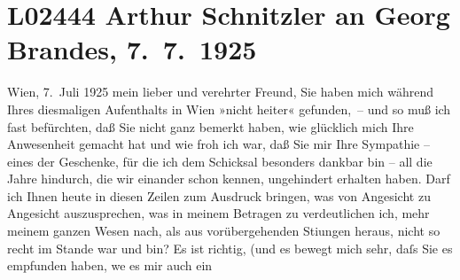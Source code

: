 

\section[Arthur Schnitzler an Georg Brandes, 7. 7. 1925]{L02444 Arthur Schnitzler an Georg Brandes, 7. 7. 1925}
\nopagebreak{}
\rehead{ }\normalsize\beginnumbering{}
\toendnotes[C]{\smallbreak\pagebreak[2]}
\toendnotes[C]{\smallbreak}
\pstart
           \raggedleft{}{\pb}Wien, 7. Juli 1925\pend
           \vspace{0.5em}
\pstart
           mein lieber und verehrter Freund, Sie haben mich während Ihres
               diesmaligen Aufenthalts in Wien »nicht heiter«
               gefunden, – und so muß ich fast befürchten, daß Sie nicht ganz bemerkt haben, wie
               glücklich mich Ihre Anwesenheit gemacht hat und wie froh ich war, daß Sie mir Ihre
               Sympathie – eines der Geschenke, für die ich dem Schicksal besonders dankbar bin –
               all die Jahre hindurch, die wir einander schon kennen, ungehindert erhalten haben.
               Darf ich Ihnen heute in diesen Zeilen zum Ausdruck bringen, was von Angesicht zu
               Angesicht auszusprechen, was in meinem Betragen zu verdeutlichen ich, mehr meinem
               ganzen Wesen nach, als aus vorübergehenden Sti{\geminationm}ungen
               heraus, nicht so recht im Stande war und bin? Es ist richtig, (und es bewegt mich
               sehr, daſs Sie es empfunden haben, we{\geminationn} es mir auch ein
